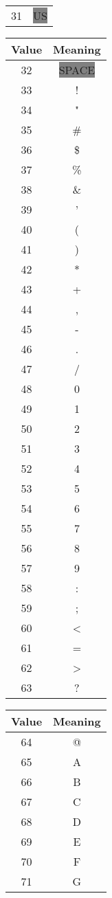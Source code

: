 {\begin{tabular}{c c}
   31 & \colorbox{gray}{US} \\
\end{tabular}
\quad
\begin{tabular}{c c}
  \hline
  Value & Meaning \\
  \hline
   32 & \colorbox{gray}{SPACE} \\
   33 & ! \\
   34 & " \\
   35 & \# \\
   36 & \$ \\
   37 & \% \\
   38 & \& \\
   39 & ' \\
   40 & ( \\
   41 & ) \\
   42 & * \\
   43 & + \\
   44 & , \\
   45 & - \\
   46 & . \\
   47 & / \\
   48 & 0 \\
   49 & 1 \\
   50 & 2 \\
   51 & 3 \\
   52 & 4 \\
   53 & 5 \\
   54 & 6 \\
   55 & 7 \\
   56 & 8 \\
   57 & 9 \\
   58 & : \\
   59 & ; \\
   60 & < \\
   61 & = \\
   62 & > \\
   63 & ? \\
\end{tabular}
\quad
\begin{tabular}{c c}
  \hline
  Value & Meaning \\
  \hline
   64 & @ \\
   65 & A \\
   66 & B \\
   67 & C \\
   68 & D \\
   69 & E \\
   70 & F \\
   71 & G \\

\end{tabular}}
